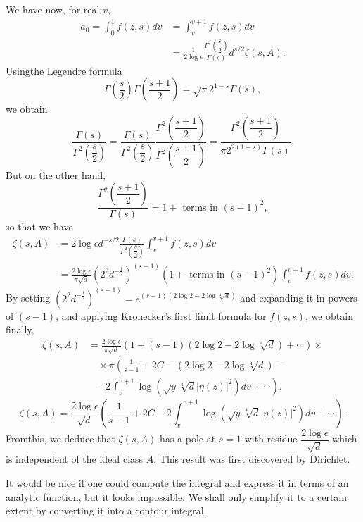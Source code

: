 We have now, for real $v$,
\begin{align*}
a_{0}=\int^{1}_{0}f(z,s)dv &= \int^{v+1}_{v}f(z,s)dv\\
&= \frac{1}{2\log
  \epsilon}\frac{\Gamma^{2}\left(\dfrac{s}{2}\right)}{\Gamma(s)}d^{s/2}\zeta(s,A). 
\end{align*}
Using\pageoriginale the Legendre formula
$$
\Gamma\left(\frac{s}{2}\right)\Gamma\left(\frac{s+1}{2}\right)=\sqrt{\pi}2^{1-s}\Gamma(s), 
$$
we obtain
$$
\frac{\Gamma(s)}{\Gamma^{2}\left(\dfrac{s}{2}\right)}=\frac{\Gamma(s)}{\Gamma^{2}\left(\dfrac{s}{2}\right)}\frac{\Gamma^{2}\left(\dfrac{s+1}{2}\right)}{\Gamma^{2}\left(\dfrac{s+1}{2}\right)}=\frac{\Gamma^{2}\left(\dfrac{s+1}{2}\right)}{\pi
  2^{2(1-s)}\Gamma(s)}.
$$
But on the other hand,
$$
\frac{\Gamma^{2}\left(\dfrac{s+1}{2}\right)}{\Gamma(s)}=1+\text{ terms
  in } (s-1)^{2},
$$
so that we have
\begin{align*}
\zeta(s,A) &= 2\log \epsilon
d^{-s/2}\frac{\Gamma(s)}{\Gamma^{2}\left(\dfrac{s}{2}\right)}\int^{v+1}_{v}f(z,s)dv
\\
&=\frac{2\log
  \epsilon}{\pi\sqrt{d}}(2^{2}d^{-\frac{1}{2}})^{(s-1)}(1+\text{ terms
  in } (s-1)^{2})\int^{v+1}_{v}f(z,s)dv. 
\end{align*}
By setting $(2^{2}d^{-\frac{1}{2}})^{(s-1)}=e^{(s-1)(2\log
  2-2\log\sqrt[4]{d})}$ and expanding it in powers of $(s-1)$, and
applying Kronecker's first limit formula for $f(z,s)$, we obtain
finally,
\begin{align*}
\zeta(s,A) &= \frac{2\log \epsilon}{\pi\sqrt{d}}(1+(s-1)(2\log
2-2\log\sqrt[4]{d})+\cdots)\times\\
&\quad \times \pi \left(\frac{1}{s-1}+2C-(2\log 2-2\log
\sqrt[4]{d})-\right.\\
&\quad
\left. -2\int^{v+1}_{v}\log(\sqrt{y}\sqrt[4]{d}|\eta(z)|^{2})dv+\cdots\right), 
\end{align*}
\ie
\begin{equation*}
\zeta(s,A)=\frac{2\log
  \epsilon}{\sqrt{d}}\left(\frac{1}{s-1}+2C-2\int^{v+1}_{v}\log
(\sqrt{y}\sqrt[4]{d}|\eta(z)|^{2})dv+\cdots\right).\tag{79}\label{79} 
\end{equation*}
From\pageoriginale this, we deduce that $\zeta(s,A)$ has a pole at
$s=1$ with residue $\dfrac{2\log \epsilon}{\sqrt{d}}$ which is
independent of the ideal class $A$. This result was first discovered
by Dirichlet.

It would be nice if one could compute the integral and express it in
terms of an analytic function, but it looks impossible. We shall only
simplify it to a certain extent by converting it into a contour
integral.

